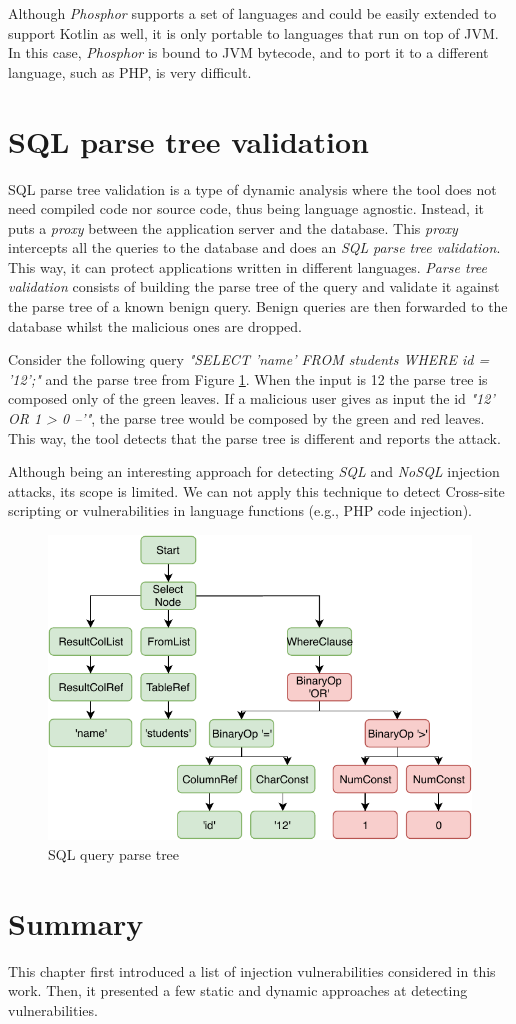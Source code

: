 Although \textit{Phosphor} supports a set of languages and could be easily extended to support Kotlin  as well, it is only portable to languages that run on top of JVM. In this case, \textit{Phosphor} is bound to JVM bytecode, and to port it to a different language, such as PHP, is very difficult. 

\section{SQL parse tree validation} 
\label{sqlparsetree}
SQL parse tree validation \cite{sqlparsetree1,sqlparsetree2} is a type of dynamic analysis where the tool does not need compiled code nor source code, thus being language agnostic. Instead, it puts a \textit{proxy} between the application server and the database. This \textit{proxy} intercepts all the queries to the database and does an \textit{SQL} \textit{parse tree validation}. This way, it can protect applications written in different languages.
\textit{Parse tree validation} consists of building the parse tree of the query and validate it against the parse tree of a known benign query.
Benign queries are then forwarded to the database whilst the malicious ones are dropped. 

Consider the following query \textit{"SELECT 'name' FROM students WHERE id = '12';"} and the parse tree from Figure \ref{invalidparsetree}. When the input is 12 the parse tree is composed only of the green leaves. If a malicious user gives as input the id \textit{"12' OR 1 > 0 --'"}, the parse tree would be composed by the green and red leaves. This way, the tool detects that the parse tree is different and reports the attack.

Although being an interesting approach for detecting \textit{SQL} and \textit{NoSQL} injection attacks, its scope is limited. We can not apply this technique to detect Cross-site scripting or vulnerabilities in language functions (e.g., PHP code injection).


\begin{figure}[h]
\centering
\includegraphics[width =0.8\linewidth]{images/sqlParseTreeInvalid.pdf}
\caption{SQL query parse tree} \label{invalidparsetree}
\end{figure}



\section{Summary}
This chapter first introduced a list of injection vulnerabilities considered in this work. Then, it presented a few static and dynamic approaches at detecting vulnerabilities.
